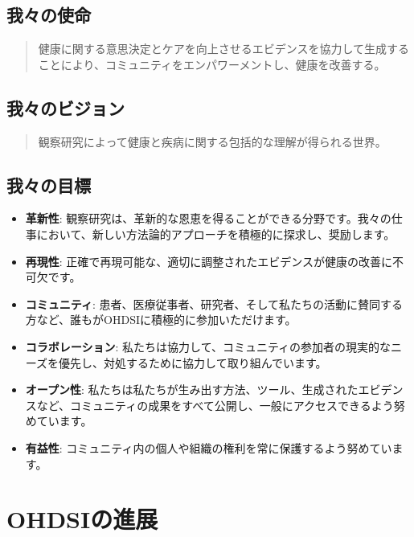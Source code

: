 \documentclass[
  11pt]{book}
\theoremstyle{definition}
\theoremstyle{definition}
\theoremstyle{definition}
\theoremstyle{definition}
\theoremstyle{remark}
\begin{document}
\subsection{我々の使命}\label{ux6211ux3005ux306eux4f7fux547d}

\begin{quote}
健康に関する意思決定とケアを向上させるエビデンスを協力して生成することにより、コミュニティをエンパワーメントし、健康を改善する。 
\end{quote}

\subsection{我々のビジョン}\label{ux6211ux3005ux306eux30d3ux30b8ux30e7ux30f3}

\begin{quote}
観察研究によって健康と疾病に関する包括的な理解が得られる世界。 
\end{quote}

\subsection{我々の目標}\label{ux6211ux3005ux306eux76eeux6a19}

\begin{itemize}
\item
  \textbf{革新性}: 観察研究は、革新的な恩恵を得ることができる分野です。我々の仕事において、新しい方法論的アプローチを積極的に探求し、奨励します。
\item
  \textbf{再現性}: 正確で再現可能な、適切に調整されたエビデンスが健康の改善に不可欠です。
\item
  \textbf{コミュニティ}: 患者、医療従事者、研究者、そして私たちの活動に賛同する方など、誰もがOHDSIに積極的に参加いただけます。 
\item
  \textbf{コラボレーション}: 私たちは協力して、コミュニティの参加者の現実的なニーズを優先し、対処するために協力して取り組んでいます。
\item
  \textbf{オープン性}: 私たちは私たちが生み出す方法、ツール、生成されたエビデンスなど、コミュニティの成果をすべて公開し、一般にアクセスできるよう努めています。
\item
  \textbf{有益性}: コミュニティ内の個人や組織の権利を常に保護するよう努めています。 
\end{itemize}

\section{OHDSIの進展}\label{ohdsiux306eux9032ux5c55}
\end{document}
